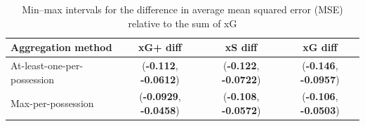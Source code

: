 \documentclass[12pt,letterpaper]{article}
\begin{document}
\begin{table}[ht]
\centering
\caption{Min--max intervals for the difference in average mean squared error (MSE) relative to the sum of xG}
\label{tab:mse_interval_comparison}
\begin{tabular}{lccc}
\hline
\textbf{Aggregation method} & \textbf{xG+ diff} & \textbf{xS diff} & \textbf{xG diff} \\
\hline
At-least-one-per-possession 
  & (\textbf{-0.112}, \textbf{-0.0612})
  & (\textbf{-0.122}, \textbf{-0.0722})
  & (\textbf{-0.146}, \textbf{-0.0957}) \\
Max-per-possession          
  & (\textbf{-0.0929}, \textbf{-0.0458})
  & (\textbf{-0.108}, \textbf{-0.0572})
  & (\textbf{-0.106}, \textbf{-0.0503}) \\
\hline
\end{tabular}
\end{table}
\end{document}
